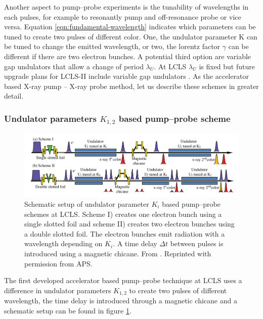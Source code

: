 Another aspect to pump--probe experiments is the tunability of wavelengths in each pulses, for example to resonantly pump and off-resonance probe or vice versa. Equation \eqref{eqn:fundamental-wavelength} indicates which parameters can be tuned to create two pulses of different color. One, the undulator parameter K can be tuned to change the emitted wavelength, or two, the lorentz factor $\gamma$ can be different if there are two electron bunches. A potential third option are variable gap undulators that allow a change of period $\lambda_{U}$. At LCLS $\lambda_{U}$ is fixed but future upgrade plans for LCLS-II include variable gap undulators \citep{Galayda-2014-IPAC}. As the accelerator based X-ray pump -- X-ray probe method, let us describe these schemes in greater detail.
%
%
%
\subsubsection{Undulator parameters $K_{1,2}$ based pump--probe scheme}
\begin{figure}
	\centering
		\includegraphics[width=1.00\textwidth]{images/Albertos-pump-probe-scheme.png}
	\caption[Schematic setup of an undulator based pump--probe scheme.]{Schematic setup of undulator parameter $K_{i}$ based pump--probe schemes at LCLS. Scheme I) creates one electron bunch using a single slotted foil and scheme II) creates two electron bunches using a double slotted foil. The electron bunches emit radiation with a wavelength depending on $K_{i}$. A time delay $\Delta t$ between pulses is introduced using a magnetic chicane. From \cite{Lutman-2013-PRL}. Reprinted with permission from APS.}
	\label{fig:Albertos-pump-probe-scheme}
\end{figure}
The first developed accelerator based pump--probe technique at LCLS \cite{Lutman-2013-PRL} uses a difference in undulator parameters $K_{1,2}$ to create two pulses of different wavelength, the time delay is introduced through a magnetic chicane and a schematic setup can be found in figure \ref{fig:Albertos-pump-probe-scheme}.\\
